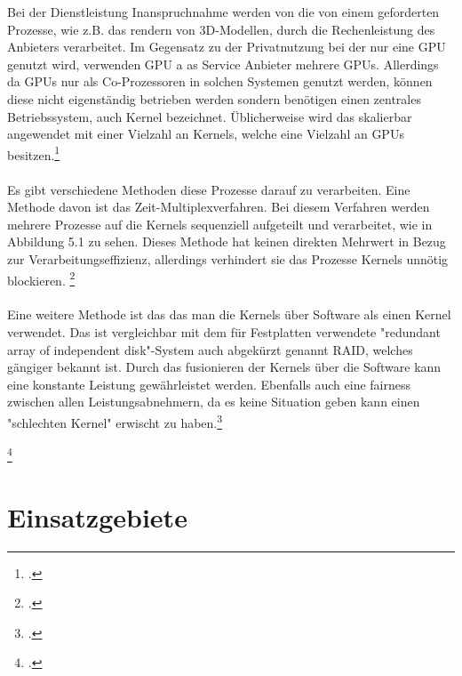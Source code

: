 \documentclass[12pt,toc=bib,toc=listof]{scrreprt}
\begin{document}
Bei der Dienstleistung Inanspruchnahme werden von die von einem geforderten
Prozesse, wie z.B. das rendern von 3D-Modellen, durch die Rechenleistung des 
Anbieters verarbeitet. Im Gegensatz zu der Privatnutzung bei der nur eine GPU genutzt wird, 
verwenden GPU a as Service Anbieter mehrere GPUs. 
Allerdings da GPUs nur als Co-Prozessoren in solchen Systemen genutzt werden, 
können diese nicht eigenständig betrieben werden sondern benötigen einen zentrales 
Betriebssystem, auch Kernel bezeichnet. Üblicherweise wird das skalierbar angewendet mit einer
Vielzahl an Kernels, welche eine Vielzahl an GPUs besitzen.\footcite [] [] {Wang.2017}
\\%
\\%
Es gibt verschiedene Methoden diese Prozesse darauf zu verarbeiten. Eine Methode davon 
ist das Zeit-Multiplexverfahren. Bei diesem Verfahren werden mehrere Prozesse auf die Kernels
sequenziell aufgeteilt und verarbeitet, wie in Abbildung 5.1 zu sehen. Dieses Methode 
hat keinen direkten Mehrwert in Bezug zur Verarbeitungseffizienz, allerdings verhindert 
sie das Prozesse Kernels unnötig blockieren. \footcite [] [] {Wang.2017}
\\ \\
Eine weitere Methode ist das das man die Kernels über Software als einen Kernel verwendet. 
Das ist vergleichbar mit dem für Festplatten verwendete "redundant array of independent disk"-System auch abgekürzt genannt RAID, 
welches gängiger bekannt ist. Durch das fusionieren der Kernels über die Software kann eine 
konstante Leistung gewährleistet werden.
Ebenfalls auch eine fairness zwischen allen Leistungsabnehmern, da es keine Situation geben kann einen 
"schlechten Kernel" erwischt zu haben.\footcite [] [] {Wang.2017}




\footcite [] [] {Wang.2017}

\section{Einsatzgebiete}
\label{sec: Einsatzgebiete}

\end{document}
